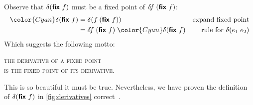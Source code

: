 \documentclass[sigplan,screen,review,timestamp,dvipsnames]{acmart}
\newcommand{\hilited}{\color{Cyan}}
\renewcommand{\d}{\delta}
\newcommand{\kw}[1]{\textsf{\bfseries #1}}
\newcommand{\efix}{\kw{fix}~}
\begin{document}
\vspace{1em}

Observe that $\d(\efix f)$ must be a fixed point of $\d\!f\;(\efix f)$:
%
\begin{align*}
  {\hilited \d(\efix f)}
  &= \d(f\: (\efix f))
  & \text{expand fixed point}\\
  &= \d\!f\; (\efix f)\; {\hilited \d(\efix f)}
  & \text{rule for}~\delta(e_1\;e_2)
\end{align*}
%
Which suggests the following motto:
\begin{center}
  \large \scshape
  the derivative of a fixed point\nopagebreak\\
  is the fixed point of its derivative.
\end{center}
%
This is so beautiful it must be true. Nevertheless, we have proven the definition of $\delta(\efix f)$ in \cref{fig:derivatives} correct~\citep{fixderiv}.





\end{document}
